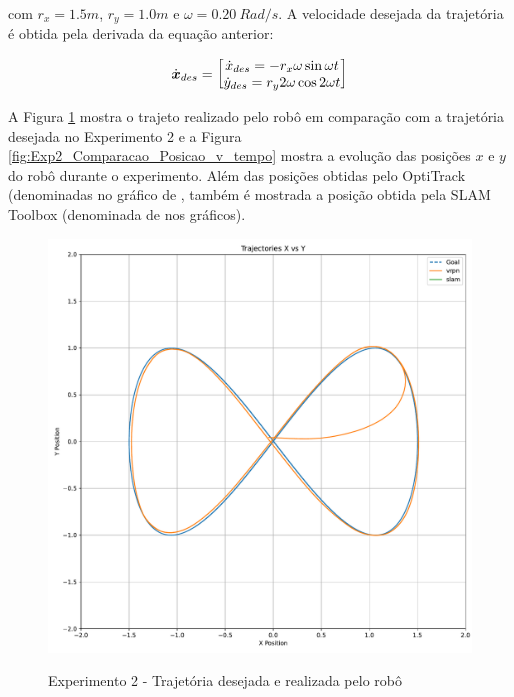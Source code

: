 com $r_x = 1.5m$, $r_y = 1.0m$ e $\omega = 0.20\ Rad/s$. A velocidade desejada da trajetória é obtida pela derivada da equação anterior:

\begin{equation}
    \dot{\boldsymbol{x}}_{des}=\begin{bmatrix} \dot{x}_{des} = -r_x \omega \sin{\omega t} \\
    \dot{y}_{des}=r_y 2\omega\cos{2 \omega t} \end{bmatrix}
\end{equation}

A Figura \ref{fig:Exp2_TrajetoriaVRPN} mostra o trajeto realizado pelo robô em comparação com a trajetória desejada no Experimento 2 e a Figura \ref{fig:Exp2_Comparacao_Posicao_v_tempo} mostra a evolução das posições $x$ e $y$ do robô durante o experimento. Além das posições obtidas pelo OptiTrack (denominadas no gráfico de , também é mostrada a posição obtida pela SLAM Toolbox (denominada de  nos gráficos).

\begin{figure}[htb]
    \centering
    \caption{Experimento 2 - Trajetória desejada e realizada pelo robô}
    \includegraphics[width=0.8\linewidth]{img/Resultados/Exp2_VRPN_Control_LEMNISCATA/Trajetoria_VRPN.pdf}
    \source
    \label{fig:Exp2_TrajetoriaVRPN}
\end{figure}

